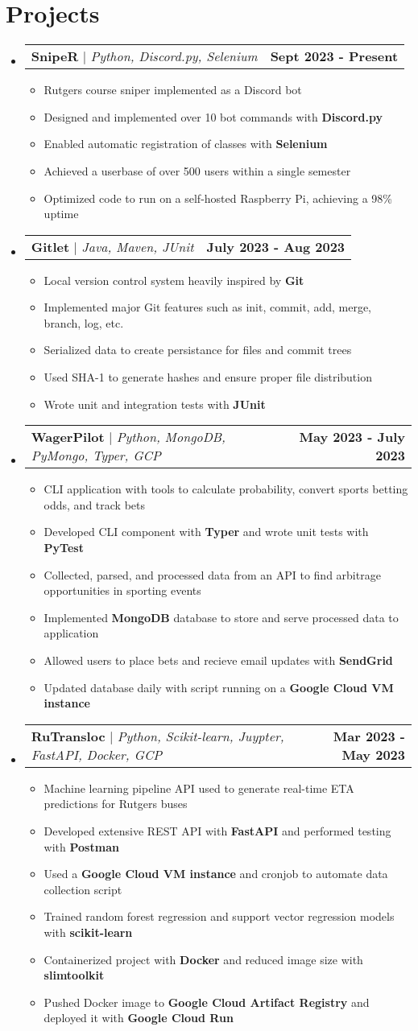 \documentclass[letterpaper,11pt]{article}
\makeatletter
\newcommand{\resumeItem}[1]{
  \item\small{
    {#1 \vspace{-2pt}}
  }
}
\newcommand{\resumeProjectHeading}[2]{
    \item
    \begin{tabular*}{0.97\textwidth}{l@{\extracolsep{\fill}}r}
      \small#1 & #2 \\
    \end{tabular*}\vspace{-7pt}
}
\newcommand{\resumeSubHeadingListStart}{\begin{itemize}[leftmargin=0.15in, label={}]}
\newcommand{\resumeSubHeadingListEnd}{\end{itemize}}
\newcommand{\resumeItemListStart}{\begin{itemize}}
\newcommand{\resumeItemListEnd}{\end{itemize}\vspace{-3pt}}
\makeatother
\begin{document}
\section{Projects}
    \resumeSubHeadingListStart
      \resumeProjectHeading
          {\textbf{SnipeR} $|$ \emph{Python, Discord.py, Selenium}}{\textbf{Sept 2023 - Present}}
          \resumeItemListStart
            \resumeItem{Rutgers course sniper implemented as a Discord bot}
            \resumeItem{Designed and implemented over 10 bot commands with \textbf{Discord.py}}
            \resumeItem{Enabled automatic registration of classes with \textbf{Selenium}}
            \resumeItem{Achieved a userbase of over 500 users within a single semester}
            \resumeItem{Optimized code to run on a self-hosted Raspberry Pi, achieving a 98\% uptime}
          \resumeItemListEnd
      \resumeProjectHeading
          {\textbf{Gitlet} $|$ \emph{Java, Maven, JUnit}}{\textbf{July 2023 - Aug 2023}}
          \resumeItemListStart
            \resumeItem{Local version control system heavily inspired by \textbf{Git}}
            \resumeItem{Implemented major Git features such as init, commit, add, merge, branch, log, etc.}
            \resumeItem{Serialized data to create persistance for files and commit trees}
            \resumeItem{Used SHA-1 to generate hashes and ensure proper file distribution}
            \resumeItem{Wrote unit and integration tests with \textbf{JUnit}}
          \resumeItemListEnd
      \resumeProjectHeading
          {\textbf{WagerPilot} $|$ \emph{Python, MongoDB, PyMongo, Typer, GCP}}{\textbf{May 2023 - July 2023}}
          \resumeItemListStart
            \resumeItem{CLI application with tools to calculate probability, convert sports betting odds, and track bets}
            \resumeItem{Developed CLI component with \textbf{Typer} and wrote unit tests with \textbf{PyTest}}
            \resumeItem{Collected, parsed, and processed data from an API to find arbitrage opportunities in sporting events}
            \resumeItem{Implemented \textbf{MongoDB} database to store and serve processed data to application}
            \resumeItem{Allowed users to place bets and recieve email updates with \textbf{SendGrid}}
            \resumeItem{Updated database daily with script running on a \textbf{Google Cloud VM instance}}
          \resumeItemListEnd
      \resumeProjectHeading
          {\textbf{RuTransloc} $|$ \emph{Python, Scikit-learn, Juypter, FastAPI, Docker, GCP}}{\textbf{Mar 2023 - May 2023}}
          \resumeItemListStart
            \resumeItem{Machine learning pipeline API used to generate real-time ETA predictions for Rutgers buses}
            \resumeItem{Developed extensive REST API with \textbf{FastAPI} and performed testing with \textbf{Postman}}
            \resumeItem{Used a \textbf{Google Cloud VM instance} and cronjob to automate data collection script}
            \resumeItem{Trained random forest regression and support vector regression models with \textbf{scikit-learn}}
            \resumeItem{Containerized project with \textbf{Docker} and reduced image size with \textbf{slimtoolkit}}
            \resumeItem{Pushed Docker image to \textbf{Google Cloud Artifact Registry} and deployed it with \textbf{Google Cloud Run}}
          \resumeItemListEnd
    \resumeSubHeadingListEnd
  

\end{document}
